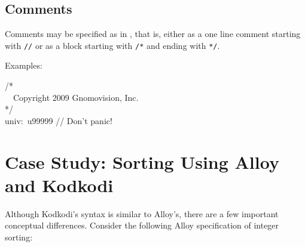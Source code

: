 \documentclass[a4paper,12pt]{article}
\begin{document}
    \subsection{Comments}
    \label{comments}

    Comments may be specified as in \cpp, that is, either as a one line comment
    starting with \verb|//| or as a block starting with \verb|/*| and ending with
    \verb|*/|.

    Examples:

    \pre
    \ttfamily\small
    /* \\
    ~~Copyright 2009 Gnomovision, Inc. \\
    */ \\[2\smallskipamount]
    univ:~u99999 // Don't panic!
    \post


    \section{Case Study: Sorting Using Alloy and Kodkodi}
    \label{case-study-sorting-using-alloy-and-kodkodi}

    Although Kodkodi's syntax is similar to Alloy's, there are a few important
    conceptual differences. Consider the following Alloy specification of integer
    sorting:
\end{document}
